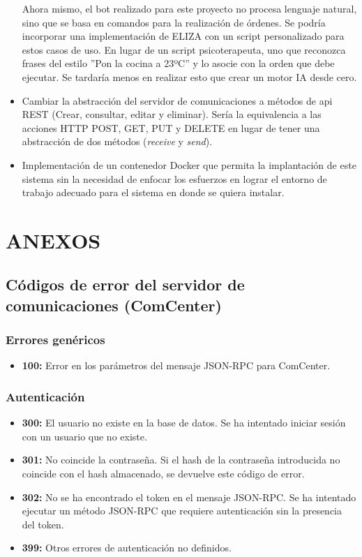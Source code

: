 \documentclass[spanish,12pt, a4paper, twoside]{paper}
\let\oldsection\section
\def\section{\cleardoublepage\oldsection}
\begin{document}
\begin{itemize}
Ahora mismo, el bot realizado para este proyecto no procesa lenguaje natural, sino que se basa en comandos para la realización de órdenes. Se podría incorporar una implementación de ELIZA con un script personalizado para estos casos de uso. En lugar de un script psicoterapeuta, uno que reconozca frases del estilo ''Pon la cocina a 23ºC'' y lo asocie con la orden que debe ejecutar. Se tardaría menos en realizar esto que crear un motor IA desde cero.

\item Cambiar la abstracción del servidor de comunicaciones a métodos de api REST (Crear, consultar, editar y eliminar). Sería la equivalencia a las acciones HTTP POST, GET, PUT y DELETE en lugar de tener una abstracción de dos métodos (\emph{receive} y \emph{send}).

\item Implementación de un contenedor Docker que permita la implantación de este sistema sin la necesidad de enfocar los esfuerzos en lograr el entorno de trabajo adecuado para el sistema en donde se quiera instalar.
\end{itemize}

\section*{ANEXOS}

\subsection*{Códigos de error del servidor de comunicaciones (ComCenter)}

\subsubsection*{Errores genéricos}

\begin{itemize}
\item\textbf{100:} Error en los parámetros del mensaje JSON-RPC para ComCenter.
\end{itemize}

\subsubsection*{Autenticación}

\begin{itemize}
\item\textbf{300:} El usuario no existe en la base de datos. Se ha intentado iniciar sesión con un usuario que no existe.
\item\textbf{301:} No coincide la contraseña. Si el hash de la contraseña introducida no coincide con el hash almacenado, se devuelve este código de error.
\item\textbf{302:} No se ha encontrado el token en el mensaje JSON-RPC. Se ha intentado ejecutar un método JSON-RPC que requiere autenticación sin la presencia del token.
\item\textbf{399:} Otros errores de autenticación no definidos.
\end{itemize}
\end{document}
